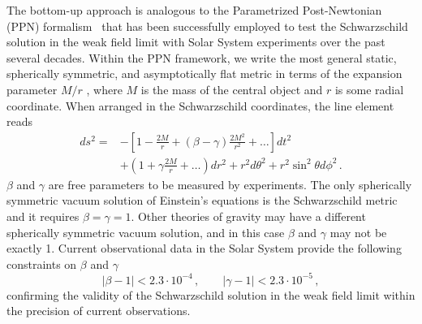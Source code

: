 \documentclass[11pt,a4paper,pdftex]{article}
\begin{document}
The bottom-up approach is analogous to the Parametrized Post-Newtonian (PPN) formalism~\cite{will} that has been successfully employed to test the Schwarzschild solution in the weak field limit with Solar System experiments over the past several decades. Within the PPN framework, we write the most general static, spherically symmetric, and asymptotically flat metric in terms of the expansion parameter $M/r$ , where $M$ is the mass of the central object and $r$ is some radial coordinate. When arranged in the Schwarzschild coordinates, the line element
reads
\begin{align}
ds^2=&-\left[1-\frac{2M}{r}+(\beta-\gamma)\frac{2M^2}{r^2}+\ldots\right]dt^2\nonumber\\
&+\left(1+\gamma\frac{2M}{r}+\ldots\right)dr^2+r^2d\theta^2 +r^2\sin^2\theta d\phi^2 \, .
\end{align}
$\beta$ and $\gamma$ are free parameters to be measured by experiments. The only spherically symmetric vacuum solution of Einstein's equations is the Schwarzschild metric and it requires $\beta=\gamma=1$. Other theories of gravity may have a different spherically symmetric vacuum solution, and in this case $\beta$ and $\gamma$ may not be exactly 1. Current observational data in the Solar System provide the following constraints on $\beta$ and $\gamma$~\cite{bertotti2003test,williams2004progress}
\begin{equation}
|\beta -1| < 2.3 \cdot10^{-4} \, , \qquad |\gamma - 1| < 2.3 \cdot 10^{-5} \, ,
\end{equation}
confirming the validity of the Schwarzschild solution in the weak field limit within the precision of current observations.
\end{document}
